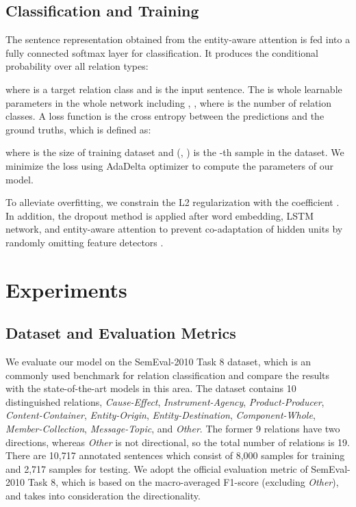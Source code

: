 \documentclass[twoside,leqno,twocolumn]{article}
\begin{document}
\subsection{Classification and Training}
The sentence representation obtained from the entity-aware attention  is fed into a fully connected softmax layer for classification. It produces the conditional probability  over all relation types:

where  is a target relation class and  is the input sentence. The  is whole learnable parameters in the whole network including , , where  is the number of relation classes.
A loss function  is the cross entropy between the predictions and the ground truths, which is defined as:

where  is the size of training dataset and (, ) is the -th sample in the dataset. We minimize the loss  using AdaDelta optimizer \cite{zeiler2012adadelta} to compute the parameters  of our model.

To alleviate overfitting, we constrain the L2 regularization with the coefficient  \cite{ng2004feature}. 
In addition, the dropout method is applied after word embedding, LSTM network, and entity-aware attention to prevent co-adaptation of hidden units by randomly omitting feature detectors \cite{hinton2012improving, zaremba2014recurrent}.



\section{Experiments}

\subsection{Dataset and Evaluation Metrics}
We evaluate our model on the SemEval-2010 Task 8 dataset, which is an commonly used benchmark for relation classification \cite{hendrickx2009semeval} and compare the results with the state-of-the-art models in this area.
The dataset contains 10 distinguished relations, \textit{Cause-Effect}, \textit{Instrument-Agency}, \textit{Product-Producer}, \textit{Content-Container}, \textit{Entity-Origin}, \textit{Entity-Destination}, \textit{Component-Whole}, \textit{Member-Collection}, \textit{Message-Topic}, and \textit{Other}.
The former 9 relations have two directions, whereas \textit{Other} is not directional, so the total number of relations is 19.
There are 10,717 annotated sentences which consist of 8,000 samples for training and 2,717 samples for testing.
We adopt the official evaluation metric of SemEval-2010 Task 8, which is based on the macro-averaged F1-score (excluding \textit{Other}), and takes into consideration the directionality.
\end{document}
